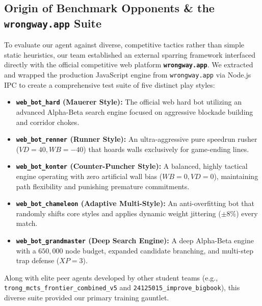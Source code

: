\subsection{Origin of Benchmark Opponents \& the \texttt{wrongway.app} Suite}
To evaluate our agent against diverse, competitive tactics rather than simple static heuristics, our team established an external sparring framework interfaced directly with the official competitive web platform \textbf{\texttt{wrongway.app}}. We extracted and wrapped the production JavaScript engine from \texttt{wrongway.app} via Node.js IPC to create a comprehensive test suite of five distinct play styles:
\begin{itemize}[leftmargin=1.5em]
    \item \textbf{\texttt{web\_bot\_hard} (Mauerer Style):} The official web hard bot utilizing an advanced Alpha-Beta search engine focused on aggressive blockade building and corridor chokes.
    \item \textbf{\texttt{web\_bot\_renner} (Runner Style):} An ultra-aggressive pure speedrun rusher ($VD = 40, WB = -40$) that hoards walls exclusively for game-ending lines.
    \item \textbf{\texttt{web\_bot\_konter} (Counter-Puncher Style):} A balanced, highly tactical engine operating with zero artificial wall bias ($WB = 0, VD = 0$), maintaining path flexibility and punishing premature commitments.
    \item \textbf{\texttt{web\_bot\_chameleon} (Adaptive Multi-Style):} An anti-overfitting bot that randomly shifts core styles and applies dynamic weight jittering ($\pm 8\%$) every match.
    \item \textbf{\texttt{web\_bot\_grandmaster} (Deep Search Engine):} A deep Alpha-Beta engine with a $650,000$ node budget, expanded candidate branching, and multi-step trap defense ($XP = 3$).
\end{itemize}
Along with elite peer agents developed by other student teams (e.g., \texttt{trong\_mcts\_frontier\_combined\_v5} and \texttt{24125015\_improve\_bigbook}), this diverse suite provided our primary training gauntlet.

